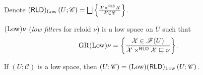 \begin{defn}
  Denote $(\mathsf{RLD})_{\Low} \left( U ; \mathscr{C} \right) =
  \bigsqcup \setcond{ \mathcal{X} \times^{\mathsf{RLD}} \mathcal{X}}
  {\mathcal{X} \in \mathscr{C} }$.
\end{defn}

\begin{defn}
  $(\operatorname{Low}) \nu$ (\emph{low filters} for reloid $\nu$) is a low
  space on $U$ such that
  \[ \operatorname{GR} (\operatorname{Low}) \nu = \left\{ \frac{\mathcal{X} \in \mathscr{F}(U)}{\mathcal{X} \times^{\mathsf{RLD}} \mathcal{X} \sqsubseteq \nu }\right\} . \]
\end{defn}

\begin{thm}
  If $\left( U ; \mathscr{C} \right)$ is a low space, then $\left( U ;
  \mathscr{C} \right) = (\operatorname{Low}) (\mathsf{RLD})_{\operatorname{Low}} \left(
  U ; \mathscr{C} \right)$.
\end{thm}

